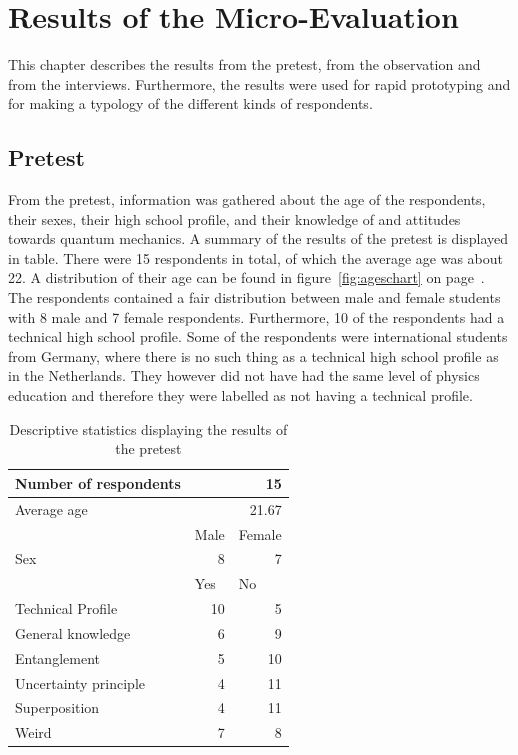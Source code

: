 \documentclass[11pt,twoside]{report} %
\begin{document}
\section{Results of the Micro-Evaluation}

This chapter describes the results from the pretest, from the observation and from the interviews. Furthermore, the results were used for rapid prototyping and for making a typology of the different kinds of respondents.

\subsection{Pretest}

From the pretest, information was gathered about the age of the respondents, their sexes, their high school profile, and their knowledge of and attitudes towards quantum mechanics. A summary of the results of the pretest is displayed in table. There were 15 respondents in total, of which the average age was about 22. A distribution of their age can be found in figure~\ref{fig:ageschart} on page~\pageref{fig:ageschart}. The respondents contained a fair distribution between male and female students with 8 male and 7 female respondents. Furthermore, 10 of the respondents had a technical high school profile. Some of the respondents were international students from Germany, where there is no such thing as a technical high school profile as in the Netherlands. They however did not have had the same level of physics education and therefore they were labelled as not having a technical profile.

\begin{table}[htbp]
\begin{center}
\begin{tabular}{|l|r|r|}
\hline
Number of respondents & \multicolumn{2}{r|}{15}  \\ \hline
Average age & \multicolumn{2}{r|}{21.67}  \\ \hline
 & \multicolumn{1}{l|}{Male} & \multicolumn{1}{l|}{Female} \\ \hline
Sex & 8 & 7 \\ \hline
 & \multicolumn{1}{l|}{Yes} & \multicolumn{1}{l|}{No} \\ \hline
Technical Profile & 10 & 5 \\ \hline
General knowledge & 6 & 9 \\ \hline
Entanglement & 5 & 10 \\ \hline
Uncertainty principle & 4 & 11 \\ \hline
Superposition & 4 & 11 \\ \hline
Weird & 7 & 8 \\ \hline
\end{tabular}
\caption{Descriptive statistics displaying the results of the pretest}
\end{center}
\label{tab:descriptive}
\end{table}
\end{document}
